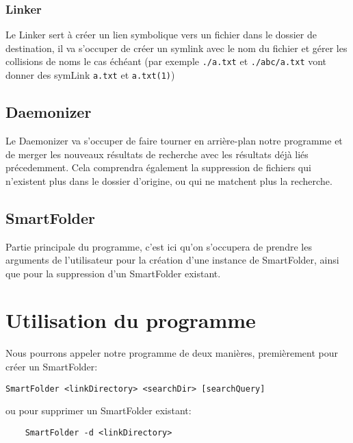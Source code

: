 \documentclass[a4paper]{article}
\begin{document}
\subsubsection{Linker}
Le Linker sert à créer un lien symbolique vers un fichier dans le dossier de destination, il va s'occuper de créer un symlink avec le nom du fichier et gérer les collisions de noms le cas échéant (par exemple \verb+./a.txt+ et \verb+./abc/a.txt+ vont donner des symLink \verb+a.txt+ et \verb+a.txt(1)+)
\subsection{Daemonizer}
Le Daemonizer va s'occuper de faire tourner en arrière-plan notre programme et de merger les nouveaux résultats de recherche avec les résultats déjà liés précedemment. Cela comprendra également la suppression de fichiers qui n'existent plus dans le dossier d'origine, ou qui ne matchent plus la recherche.
\subsection{SmartFolder}
Partie principale du programme, c'est ici qu'on s'occupera de prendre les arguments de l'utilisateur pour la création d'une instance de SmartFolder, ainsi que pour la suppression d'un SmartFolder existant.
\section{Utilisation du programme}
Nous pourrons appeler notre programme de deux manières, premièrement pour créer un SmartFolder:
\begin{verbatim}
SmartFolder <linkDirectory> <searchDir> [searchQuery]
\end{verbatim}
ou pour supprimer un SmartFolder existant:
\begin{verbatim}
	SmartFolder -d <linkDirectory>
\end{verbatim}
\end{document}
